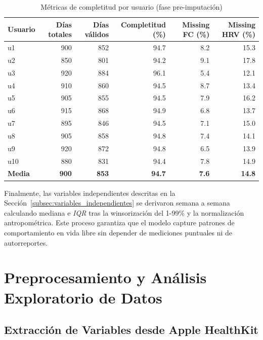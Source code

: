 \begin{table}[htbp]
    \centering
    \caption{Métricas de completitud por usuario (fase pre-imputación)}
    \label{tab:data_quality_raw}
    \small
    \begin{tabular}{@{}lrrrrr@{}}
        \toprule
        \textbf{Usuario} & \textbf{Días totales} & \textbf{Días válidos} & \textbf{Completitud (\%)} & \textbf{Missing FC (\%)} & \textbf{Missing HRV (\%)} \\
        \midrule
        u1 & 900 & 852 & 94.7 & 8.2 & 15.3 \\
        u2 & 850 & 801 & 94.2 & 9.1 & 17.8 \\
        u3 & 920 & 884 & 96.1 & 5.4 & 12.1 \\
        u4 & 910 & 860 & 94.5 & 8.7 & 13.4 \\
        u5 & 905 & 855 & 94.5 & 7.9 & 16.2 \\
        u6 & 915 & 868 & 94.9 & 6.8 & 13.7 \\
        u7 & 895 & 846 & 94.5 & 7.1 & 15.0 \\
        u8 & 905 & 858 & 94.8 & 7.4 & 14.1 \\
        u9 & 920 & 872 & 94.8 & 6.5 & 13.9 \\
        u10 & 880 & 831 & 94.4 & 7.8 & 14.9 \\
        \midrule
        \textbf{Media} & \textbf{900} & \textbf{853} & \textbf{94.7} & \textbf{7.6} & \textbf{14.8} \\
        \bottomrule
    \end{tabular}
\end{table}

Finalmente, las variables independientes descritas en la Sección~\ref{subsec:variables_independientes} se derivaron semana a semana calculando mediana e \textit{IQR} tras la winsorización del 1-99\% y la normalización antropométrica. Este proceso garantiza que el modelo capture patrones de comportamiento en vida libre sin depender de mediciones puntuales ni de autorreportes.

\section{Preprocesamiento y Análisis Exploratorio de Datos}
\label{sec:preprocesamiento_eda}

\subsection{Extracción de Variables desde Apple HealthKit}
\label{subsec:extraccion_variables}


